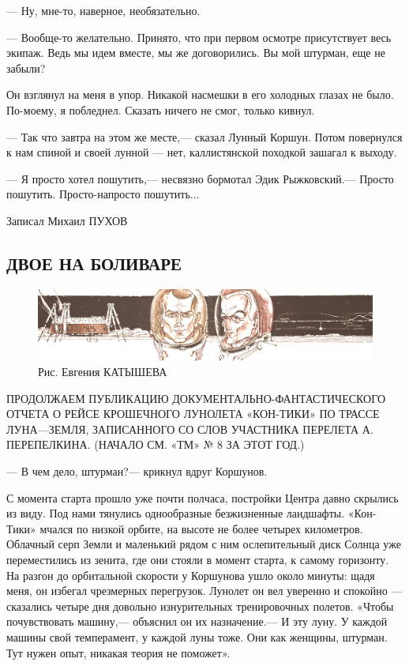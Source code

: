 \documentclass[11pt,a4paper,oneside]{article}
\begin{document}
— Ну, мне-то, наверное, необязательно.

— Вообще-то желательно. Принято, что при первом осмотре присутствует весь экипаж. Ведь мы идем вместе, мы же договорились. Вы мой штурман, еще не забыли?

Он взглянул на меня в упор. Никакой насмешки в его холодных глазах не было. По-моему, я побледнел. Сказать ничего не смог, только кивнул.

— Так что завтра на этом же месте,— сказал Лунный Коршун. Потом повернулся к нам спиной и своей лунной — нет, каллистянской походкой зашагал к выходу.

— Я просто хотел пошутить,— несвязно бормотал Эдик Рыжковский.— Просто пошутить. Просто-напросто пошутить...

Записал Михаил ПУХОВ

\subsection{ДВОЕ НА БОЛИВАРЕ}
\label{bolivar}
\begin{figure}[H]
\includegraphics[width=\textwidth]{bolivar}
\caption{Рис. Евгения КАТЫШЕВА}
\end{figure}

ПРОДОЛЖАЕМ ПУБЛИКАЦИЮ ДОКУМЕНТАЛЬНО-ФАНТАСТИЧЕСКОГО ОТЧЕТА О РЕЙСЕ КРОШЕЧНОГО ЛУНОЛЕТА «КОН-ТИКИ» ПО ТРАССЕ ЛУНА—ЗЕМЛЯ, ЗАПИСАННОГО СО СЛОВ УЧАСТНИКА ПЕРЕЛЕТА А. ПЕРЕПЕЛКИНА. (НАЧАЛО СМ. «ТМ» № 8 ЗА ЭТОТ ГОД.)

— В чем дело, штурман?— крикнул вдруг Коршунов.

С момента старта прошло уже почти полчаса, постройки Центра давно скрылись из виду. Под нами тянулись однообразные безжизненные ландшафты. «Кон-Тики» мчался по низкой орбите, на высоте не более четырех километров. Облачный серп Земли и маленький рядом с ним ослепительный диск Солнца уже переместились из зенита, где они стояли в момент старта, к самому горизонту. На разгон до орбитальной скорости у Коршунова ушло около минуты: щадя меня, он избегал чрезмерных перегрузок. Лунолет он вел уверенно и спокойно — сказались четыре дня довольно изнурительных тренировочных полетов. «Чтобы почувствовать машину,— объяснил он их назначение.— И эту луну. У каждой машины свой темперамент, у каждой луны тоже. Они как женщины, штурман. Тут нужен опыт, никакая теория не поможет».
\end{document}

